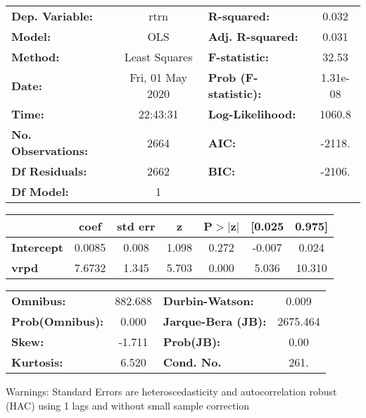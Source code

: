 \begin{center}
\begin{tabular}{lclc}
\toprule
\textbf{Dep. Variable:}    &       rtrn       & \textbf{  R-squared:         } &     0.032   \\
\textbf{Model:}            &       OLS        & \textbf{  Adj. R-squared:    } &     0.031   \\
\textbf{Method:}           &  Least Squares   & \textbf{  F-statistic:       } &     32.53   \\
\textbf{Date:}             & Fri, 01 May 2020 & \textbf{  Prob (F-statistic):} &  1.31e-08   \\
\textbf{Time:}             &     22:43:31     & \textbf{  Log-Likelihood:    } &    1060.8   \\
\textbf{No. Observations:} &        2664      & \textbf{  AIC:               } &    -2118.   \\
\textbf{Df Residuals:}     &        2662      & \textbf{  BIC:               } &    -2106.   \\
\textbf{Df Model:}         &           1      & \textbf{                     } &             \\
\bottomrule
\end{tabular}
\begin{tabular}{lcccccc}
                   & \textbf{coef} & \textbf{std err} & \textbf{z} & \textbf{P$> |$z$|$} & \textbf{[0.025} & \textbf{0.975]}  \\
\midrule
\textbf{Intercept} &       0.0085  &        0.008     &     1.098  &         0.272        &       -0.007    &        0.024     \\
\textbf{vrpd}      &       7.6732  &        1.345     &     5.703  &         0.000        &        5.036    &       10.310     \\
\bottomrule
\end{tabular}
\begin{tabular}{lclc}
\textbf{Omnibus:}       & 882.688 & \textbf{  Durbin-Watson:     } &    0.009  \\
\textbf{Prob(Omnibus):} &   0.000 & \textbf{  Jarque-Bera (JB):  } & 2675.464  \\
\textbf{Skew:}          &  -1.711 & \textbf{  Prob(JB):          } &     0.00  \\
\textbf{Kurtosis:}      &   6.520 & \textbf{  Cond. No.          } &     261.  \\
\bottomrule
\end{tabular}
\end{center}

Warnings: \newline
 [1] Standard Errors are heteroscedasticity and autocorrelation robust (HAC) using 1 lags and without small sample correction